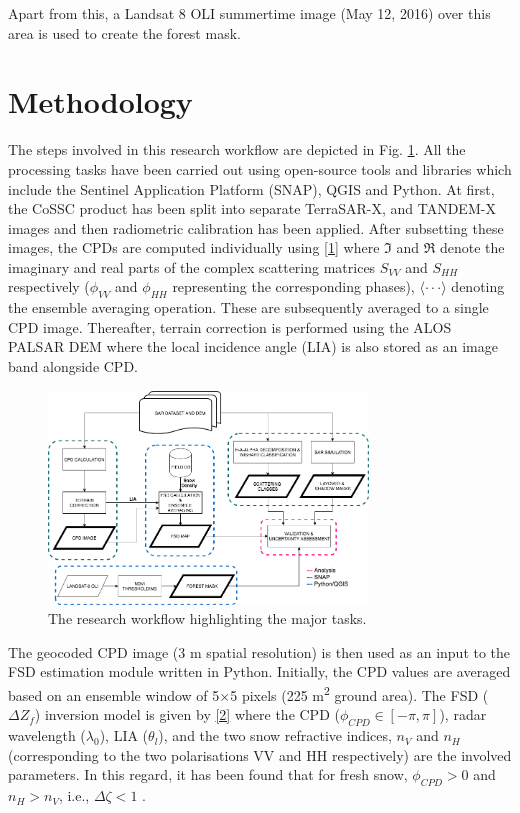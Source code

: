 \documentclass{article}
\begin{document}
Apart from this, a Landsat 8 OLI summertime image (May 12, 2016) over this area is used to create the forest mask.    
\section{Methodology}
\label{sec:method}
The steps involved in this research workflow are depicted in Fig. \ref{fig:work}. All the processing tasks have been carried out using open-source tools and libraries which include the Sentinel Application Platform (SNAP), QGIS and Python. At first, the CoSSC product has been split into separate TerraSAR-X, and TANDEM-X images and then radiometric calibration has been applied. After subsetting these images, the CPDs are computed individually using \eqref{1} where $\Im$ and $\Re$ denote the imaginary and real parts of the complex scattering matrices $S_{VV}$ and $S_{HH}$ respectively ($\phi_{VV}$ and $\phi_{HH}$ representing the corresponding phases), $\langle\cdot\cdot\cdot\rangle$ denoting the ensemble averaging operation. These are subsequently averaged to a single CPD image. Thereafter, terrain correction is performed using the ALOS PALSAR DEM where the local incidence angle (LIA) is also stored as an image band alongside CPD. 

\begin{figure}[htb]
\centering
\includegraphics[width=8.5cm]{Pictures/Method_FSD.png}
\caption{The research workflow highlighting the major tasks.}
\label{fig:work}
\end{figure}

The geocoded CPD image (3 m spatial resolution) is then used as an input to the FSD estimation module written in Python. Initially, the CPD values are averaged based on an ensemble window of 5$\times$5 pixels (225 m\textsuperscript{2} ground area). The FSD ($\Delta Z_f$) inversion model is given by \eqref{2} where the CPD ($\phi_{CPD}\in[-\pi,\pi]$), radar wavelength ($\lambda_0$), LIA ($\theta_l$), and the two snow refractive indices, $n_V$ and $n_H$ (corresponding to the two polarisations VV and HH respectively) are the involved parameters. In this regard, it has been found that for fresh snow,  $\phi_{CPD}>0$ and $n_H>n_V$, i.e., $\Delta{\zeta}<1$ \cite{Leinss2014}.
\end{document}
